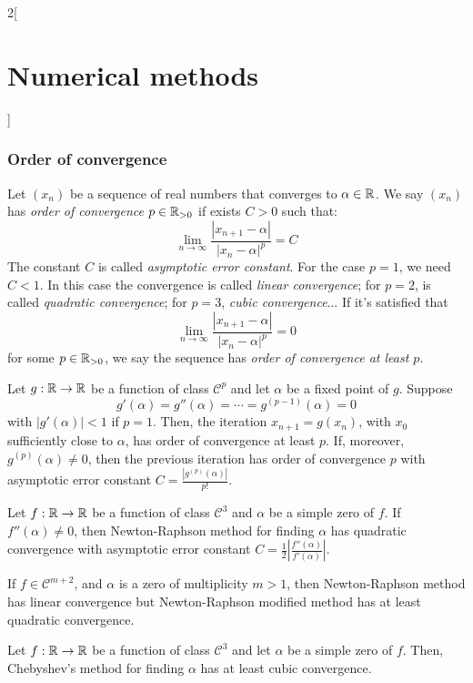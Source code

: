 \documentclass[../../../main.tex]{subfiles}
\begin{document}
\begin{multicols}{2}[\section{Numerical methods}]
  \subsubsection{Order of convergence}
  \begin{definition}
    Let $(x_n)$ be a sequence of real numbers that converges to $\alpha\in\mathbb{R}$. We say $(x_n)$ has \emph{order of convergence} $p\in\mathbb{R}_{>0}$ if exists $C>0$ such that: $$\lim_{n\to\infty}\frac{|x_{n+1}-\alpha|}{|x_n-\alpha|^p}=C$$ The constant $C$ is called \emph{asymptotic error constant}. For the case $p=1$, we need $C<1$. In this case the convergence is called \emph{linear convergence}; for $p=2$, is called \emph{quadratic convergence}; for $p=3$, \emph{cubic convergence}... If it's satisfied that $$\lim_{n\to\infty}\frac{|x_{n+1}-\alpha|}{|x_n-\alpha|^p}=0$$ for some $p\in\mathbb{R}_{>0}$, we say the sequence has \emph{order of convergence at least $p$}.
  \end{definition}
  \begin{theorem}
    Let $g:\mathbb{R}\rightarrow\mathbb{R}$ be a function of class $\mathcal{C}^p$ and let $\alpha$ be a fixed point of $g$. Suppose $$g'(\alpha)=g''(\alpha)=\cdots=g^{(p-1)}(\alpha)=0$$ with $|g'(\alpha)|<1$ if $p=1$. Then, the iteration $x_{n+1}=g(x_n)$, with $x_0$ sufficiently close to $\alpha$, has order of convergence at least $p$. If, moreover, $g^{(p)}(\alpha)\ne0$, then the previous iteration has order of convergence $p$ with asymptotic error constant $C=\frac{|g^{(p)}(\alpha)|}{p!}$.
  \end{theorem}
  \begin{theorem}
    Let $f:\mathbb{R}\rightarrow\mathbb{R}$ be a function of class $\mathcal{C}^3$ and $\alpha$ be a simple zero of $f$. If $f''(\alpha)\ne0$, then Newton-Raphson method for finding $\alpha$ has quadratic convergence with asymptotic error constant $C=\frac{1}{2}\left|\frac{f''(\alpha)}{f'(\alpha)}\right|$.\par If $f\in\mathcal{C}^{m+2}$, and $\alpha$ is a zero of multiplicity $m>1$, then Newton-Raphson method has linear convergence but Newton-Raphson modified method has at least quadratic convergence.
  \end{theorem}
  \begin{theorem}
    Let $f:\mathbb{R}\rightarrow\mathbb{R}$ be a function of class $\mathcal{C}^3$ and let $\alpha$ be a simple zero of $f$. Then, Chebyshev's method for finding $\alpha$ has at least cubic convergence.
  \end{theorem}
  \begin{definition}

\end{definition}
\end{multicols}
\end{document}
